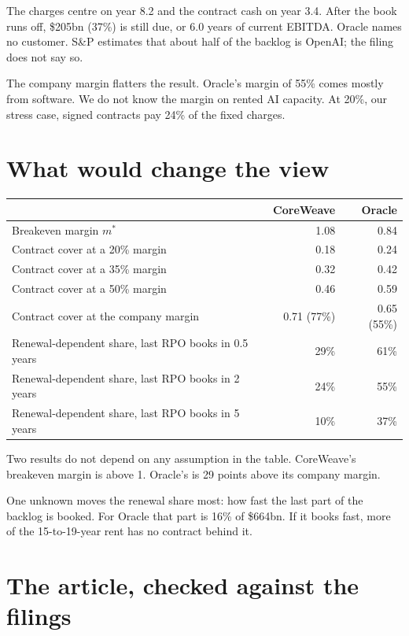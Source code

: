 \documentclass[11pt,a4paper]{article}
\begin{document}
The charges centre on year 8.2 and the contract cash on year 3.4. After the book runs off, \$205bn (37\%) is still due, or 6.0 years of current EBITDA. Oracle names no customer. S\&P estimates that about half of the backlog is OpenAI; the filing does not say so.

The company margin flatters the result. Oracle's margin of 55\% comes mostly from software. We do not know the margin on rented AI capacity. At 20\%, our stress case, signed contracts pay 24\% of the fixed charges.

\section{What would change the view}

\begin{center}
\begin{tabular}{@{}lrr@{}}\toprule
 & CoreWeave & Oracle \\\midrule
Breakeven margin $m^{*}$ & 1.08 & 0.84 \\
Contract cover at a 20\% margin & 0.18 & 0.24 \\
Contract cover at a 35\% margin & 0.32 & 0.42 \\
Contract cover at a 50\% margin & 0.46 & 0.59 \\
Contract cover at the company margin & 0.71 (77\%) & 0.65 (55\%) \\\midrule
Renewal-dependent share, last RPO books in 0.5 years & 29\% & 61\% \\
Renewal-dependent share, last RPO books in 2 years & 24\% & 55\% \\
Renewal-dependent share, last RPO books in 5 years & 10\% & 37\% \\\bottomrule
\end{tabular}
\end{center}

Two results do not depend on any assumption in the table. CoreWeave's breakeven margin is above 1. Oracle's is 29 points above its company margin.

One unknown moves the renewal share most: how fast the last part of the backlog is booked. For Oracle that part is 16\% of \$664bn. If it books fast, more of the 15-to-19-year rent has no contract behind it.

\section{The article, checked against the filings}
\end{document}
